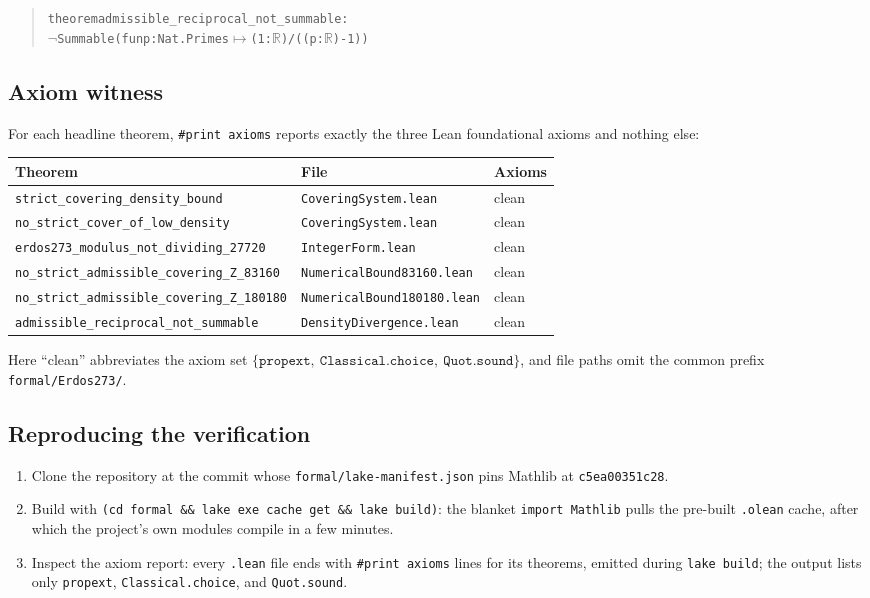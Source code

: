 \documentclass[11pt,a4paper]{article}
\theoremstyle{plain}
\theoremstyle{definition}
\theoremstyle{remark}
\begin{document}
\begin{quote}
\begin{alltt}\small
theorem admissible_reciprocal_not_summable :
    \(\lnot\) Summable (fun p : Nat.Primes \(\mapsto\) (1 : \(\mathbb{R}\)) / ((p : \(\mathbb{R}\)) - 1))
\end{alltt}
\end{quote}

\subsection*{Axiom witness}

For each headline theorem, \texttt{\#print axioms} reports exactly the
three Lean foundational axioms and nothing else:

\begin{center}
\begin{tabular}{lll}
\toprule
Theorem & File & Axioms \\
\midrule
\texttt{strict\_covering\_density\_bound}
  & \texttt{CoveringSystem.lean} & clean \\
\texttt{no\_strict\_cover\_of\_low\_density}
  & \texttt{CoveringSystem.lean} & clean \\
\texttt{erdos273\_modulus\_not\_dividing\_27720}
  & \texttt{IntegerForm.lean} & clean \\
\texttt{no\_strict\_admissible\_covering\_Z\_83160}
  & \texttt{NumericalBound83160.lean} & clean \\
\texttt{no\_strict\_admissible\_covering\_Z\_180180}
  & \texttt{NumericalBound180180.lean} & clean \\
\texttt{admissible\_reciprocal\_not\_summable}
  & \texttt{DensityDivergence.lean} & clean \\
\bottomrule
\end{tabular}
\end{center}

\noindent Here ``clean'' abbreviates the axiom set
$\{\texttt{propext},\ \texttt{Classical.choice},\ \texttt{Quot.sound}\}$,
and file paths omit the common prefix \texttt{formal/Erdos273/}.

\subsection*{Reproducing the verification}

\begin{enumerate}
\item Clone the repository at the commit whose
\texttt{formal/lake-manifest.json} pins Mathlib at \texttt{c5ea00351c28}.
\item Build with \texttt{(cd formal \&\& lake exe cache get \&\& lake
build)}: the blanket \texttt{import Mathlib} pulls the pre-built
\texttt{.olean} cache, after which the project's own modules compile in a
few minutes.
\item Inspect the axiom report: every \texttt{.lean} file ends with
\texttt{\#print axioms} lines for its theorems, emitted during
\texttt{lake build}; the output lists only \texttt{propext},
\texttt{Classical.choice}, and \texttt{Quot.sound}.
\end{enumerate}
\end{document}
